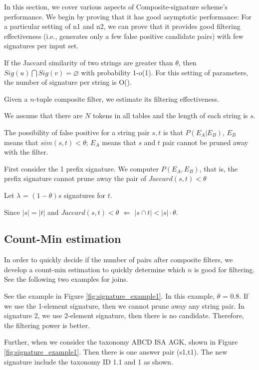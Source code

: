 In this section, we cover various aspects of Composite-signature scheme's performance.
We begin by proving that it has good asymptotic performance: For a particular setting of n1 and n2, we can prove
that it provides good filtering effectiveness (i.e., generates only a few false positive candidate pairs) with few signatures per input set.

\begin{theorem} If the Jaccard similarity of two strings are greater than $\theta$, then $Sig(u) \bigcap Sig(v) = \varnothing$ with probability 1-o(1). For this setting of parameters, the number of signature per string is O().
\end{theorem}


Given a $n$-tuple composite filter, we estimate its filtering effectiveness.

We assume that there are $N$ tokens in all tables and the length of each string is $s$. 

The possibility of false positive for a string pair $s, t$ is that $P(E_A | E_B)$, $E_B$ means that  $sim(s,t) < \theta$; $E_A$ means that $s$ and $t$ pair cannot be pruned away with the filter.  

First consider the 1 prefix signature. We computer $P(E_A, E_B)$, that is, the prefix signature cannot prune away the pair of $Jaccard(s,t) < \theta$

Let $\lambda$ = $(1-\theta)s$ signatures for $t$.

Since $|s| = |t|$ and   $Jaccard(s,t) < \theta$ $\Longleftarrow$ $ |s \cap t| < |s| \cdot \theta$. 

\subsection{Count-Min estimation}

In order to quickly decide if the number of pairs after composite filters, we develop a count-min estimation to quickly determine which $n$ is good for filtering. See the following two examples for joins.

See the example in Figure \ref{fig:signature_example1}. In this example, $\theta$ = 0.8. If we use the 1-element signature, then we cannot prune away any string pair. In signature 2, we use 2-element signature, then there is no candidate. Therefore, the filtering power is better.

Further, when we consider the taxonomy ABCD ISA AGK, shown in Figure \ref{fig:signature_example1}. Then there is one answer pair (s1,t1). The new signature include the taxonomy ID 1.1 and 1  as shown.

